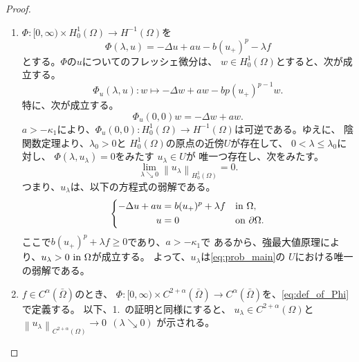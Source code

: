\begin{proof}
 \begin{enumerate}[1.]
  \item $\Phi \colon [0,\infty) \times H^1_0 (\Omega) \to H^{-1}(\Omega)$を
        \begin{equation}
         \Phi (\lambda, u) = -\Delta u + au - b (u_{+})^p - \lambda f
          \label{eq:def_of_Phi}
        \end{equation}
        とする。$\Phi$の$u$についてのフレッシェ微分は、
        $w \in H^1_0(\Omega)$とすると、次が成立する。
        \[
         \Phi_u (\lambda, u) \colon w \mapsto -\Delta w + aw - b p(u_+)^{p-1} w.
        \]
        特に、次が成立する。
        \[
         \Phi_u (0, 0) w = -\Delta w + aw.
        \]
        $a > -\kappa_1$により、$\Phi_u(0,0) \colon
        H^1_0(\Omega) \to H^{-1} (\Omega)$は可逆である。ゆえに、
        陰関数定理より、$\lambda_0 > 0$と
        $H_0^1(\Omega)$の原点の近傍$U$が存在して、
        $0 < \lambda \leq \lambda_0$に対し、
        $\Phi(\lambda, u_\lambda) = 0$をみたす
        $u_\lambda \in U$が
        唯一つ存在し、次をみたす。
        \[\lim_{\lambda \searrow 0} \left\| u_\lambda
        \right\|_{H^1_0(\Omega)} 
        = 0. \]
        つまり、$u_\lambda$は、以下の方程式の弱解である。
        \begin{align}
         \left\{
         \begin{aligned}
          -\Delta u + a u &= b (u_+)^p + \lambda f  & &\text{in}~ \Omega,  \\
          u &= 0 & &\text{on}~ \partial\Omega.
         \end{aligned}
         \right. \label{eq:prob_lem_ifthm}
        \end{align}
        ここで$b (u_+)^p + \lambda f \geq 0$であり、$a > -\kappa_1$で
        あるから、強最大値原理により、$u_\lambda > 0 ~\text{in}~
        \Omega$が成立する。
        よって、$u_\lambda$は\ref{eq:prob_main}の
        $U$における唯一の弱解である。
  \item $f \in C^\alpha(\bar{\Omega})$のとき、
        $\Phi \colon [0,\infty) \times C^{2+\alpha} (\bar{\Omega})
        \to C^\alpha(\bar{\Omega})$を、\eqref{eq:def_of_Phi}で定義する。
        以下、1.~の証明と同様にすると、
        $u_\lambda \in
        C^{2+\alpha}(\Omega)$と
        $\left\| u_\lambda
        \right\|_{C^{2+\alpha}(\Omega)} \to 0 \ \ (\lambda \searrow
        0)$
        が示される。\qedhere
 \end{enumerate}
\end{proof}

